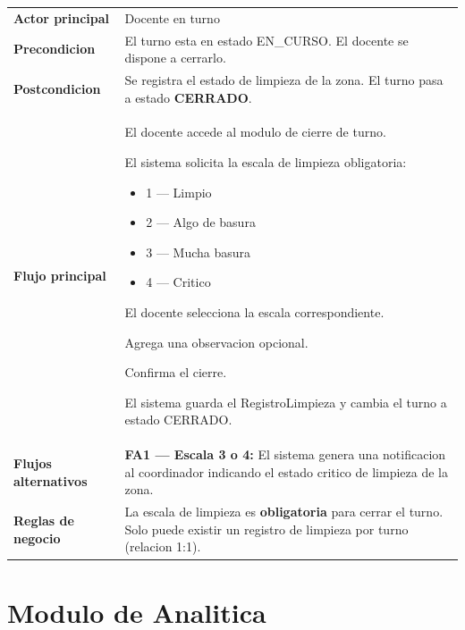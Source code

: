 \documentclass[12pt, a4paper]{article}
\newcommand{\cu}[3]{%
  \begin{tcolorbox}[casousostyle, title={#1},
    after title={\hfill\small\normalfont\color{white!80!azulOscuro}#2}]
  \renewcommand{\arraystretch}{1.35}
  \begin{tabularx}{\linewidth}{>{\bfseries\color{azulOscuro}\small}p{3.6cm} X}
  #3
  \end{tabularx}
  \end{tcolorbox}
  \vspace{6pt}
}
\newcommand{\fcu}[2]{\small\textbf{\color{azulOscuro}#1} & \small #2 \\}
\begin{document}
\cu{CU-11 --- Registrar limpieza al cierre del turno}{Docente}{
  \fcu{Actor principal}{Docente en turno}
  \fcu{Precondicion}{El turno esta en estado EN\_CURSO. El docente se dispone a cerrarlo.}
  \fcu{Postcondicion}{Se registra el estado de limpieza de la zona. El turno pasa a estado \textbf{CERRADO}.}
  \fcu{Flujo principal}{
    \begin{pasos}
      \item El docente accede al modulo de cierre de turno.
      \item El sistema solicita la escala de limpieza obligatoria:
        \begin{itemize}[itemsep=1pt, topsep=2pt]
          \item 1 --- Limpio
          \item 2 --- Algo de basura
          \item 3 --- Mucha basura
          \item 4 --- Critico
        \end{itemize}
      \item El docente selecciona la escala correspondiente.
      \item Agrega una observacion opcional.
      \item Confirma el cierre.
      \item El sistema guarda el RegistroLimpieza y cambia el turno a estado CERRADO.
    \end{pasos}
  }
  \fcu{Flujos alternativos}{
    \textbf{FA1 --- Escala 3 o 4:} El sistema genera una notificacion al coordinador indicando el estado critico de limpieza de la zona.
  }
  \fcu{Reglas de negocio}{La escala de limpieza es \textbf{obligatoria} para cerrar el turno. Solo puede existir un registro de limpieza por turno (relacion 1:1).}
}

\newpage

\section{Modulo de Analitica}
\end{document}
